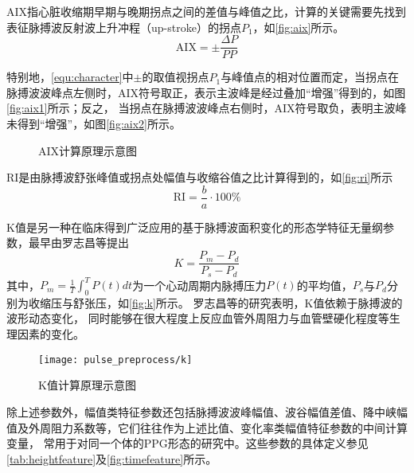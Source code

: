 AIX指心脏收缩期早期与晚期拐点之间的差值与峰值之比，计算的关键需要先找到表征脉搏波反射波上升冲程（up-stroke）的拐点$P_1$，如\autoref{fig:aix}所示\cite{Su2014}。
\begin{equation}
    \label{equ:aix}
    \text{AIX} = \pm \frac{\Delta P}{PP}
\end{equation}

特别地，\autoref{equ:character}中$\pm$的取值视拐点$P_1$与峰值点的相对位置而定，当拐点在脉搏波波峰点左侧时，AIX符号取正，表示主波峰是经过叠加“增强”得到的，如图\autoref{fig:aix1}所示；反之，
当拐点在脉搏波波峰点右侧时，AIX符号取负，表明主波峰未得到“增强”，如图\autoref{fig:aix2}所示。
\begin{figure}[htbp]
    \centering
    \quad
    \caption[AIX计算原理示意图]{\label{fig:aix}AIX计算原理示意图\cite{Su2014}}
\end{figure}

RI是由脉搏波舒张峰值或拐点处幅值与收缩谷值之比计算得到的，如\autoref{fig:ri}所示\cite{Su2014,Elgendi2012}
\begin{equation}
    \label{equ:ri}
    \text{RI} = \frac{b}{a} \cdot 100\%
\end{equation}

K值是另一种在临床得到广泛应用的基于脉搏波面积变化的形态学特征无量纲参数，最早由罗志昌等\cite{Luo1988,PPGYY}提出
\begin{equation}
    \label{equ:ppgk}
    K=\frac{P_m-P_d}{P_s-P_d}
\end{equation}
其中，$P_m=\frac{1}{T}\int_{0}^{T}P(t)dt$为一个心动周期内脉搏压力$P(t)$的平均值，$P_s$与$P_d$分别为收缩压与舒张压，如\autoref{fig:k}所示。
罗志昌等\cite{Luo1988,PPGYY}的研究表明，K值依赖于脉搏波的波形动态变化，
同时能够在很大程度上反应血管外周阻力与血管壁硬化程度等生理因素的变化。
\begin{figure}[htbp]
    \centering
    \texttt{[image: pulse\_preprocess/k]}
    \caption{\label{fig:k}K值计算原理示意图}
\end{figure}

除上述参数外，幅值类特征参数还包括脉搏波波峰幅值、波谷幅值差值、降中峡幅值及外周阻力系数等，它们往往作为上述比值、变化率类幅值特征参数的中间计算变量，
常用于对同一个体的PPG形态的研究中\cite{cwl,mmt}。这些参数的具体定义参见\autoref{tab:heightfeature}及\autoref{fig:timefeature}所示。

